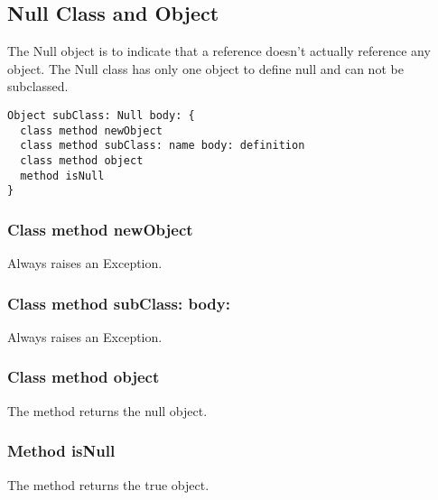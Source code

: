 \subsection {Null Class and Object}

The Null object is to indicate that a reference doesn't actually reference
any object. The Null class has only one object to define null and can not
be subclassed.

\begin{lstlisting}
Object subClass: Null body: {
  class method newObject
  class method subClass: name body: definition
  class method object
  method isNull
}
\end{lstlisting}

\subsubsection{Class method newObject}
Always raises an Exception.

\subsubsection{Class method subClass: body:}
Always raises an Exception.

\subsubsection{Class method object}
The method returns the null object.

\subsubsection{Method isNull}
The method returns the true object.
